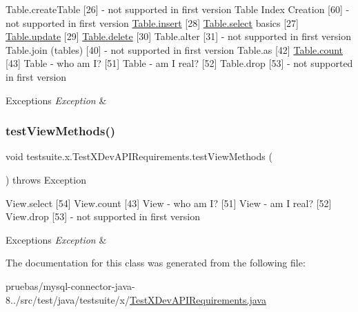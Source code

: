 Table.\+create\+Table \mbox{[}26\mbox{]} -\/ not supported in first version Table Index Creation \mbox{[}60\mbox{]} -\/ not supported in first version \mbox{\hyperlink{interfacecom_1_1mysql_1_1cj_1_1xdevapi_1_1_table_ae9faedd85539146509fa68982fc346f9}{Table.\+insert}} \mbox{[}28\mbox{]} \mbox{\hyperlink{interfacecom_1_1mysql_1_1cj_1_1xdevapi_1_1_table_a36559f114d9638a63d8743f1f1630017}{Table.\+select}} basics \mbox{[}27\mbox{]} \mbox{\hyperlink{interfacecom_1_1mysql_1_1cj_1_1xdevapi_1_1_table_a941215cefeb7236388db7d0390621a17}{Table.\+update}} \mbox{[}29\mbox{]} \mbox{\hyperlink{interfacecom_1_1mysql_1_1cj_1_1xdevapi_1_1_table_a52be4284a88e0a4f243580be570018e2}{Table.\+delete}} \mbox{[}30\mbox{]} Table.\+alter \mbox{[}31\mbox{]} -\/ not supported in first version Table.\+join (tables) \mbox{[}40\mbox{]} -\/ not supported in first version Table.\+as \mbox{[}42\mbox{]} \mbox{\hyperlink{interfacecom_1_1mysql_1_1cj_1_1xdevapi_1_1_table_a4f0524bd76d54d6b053187ea09ab2956}{Table.\+count}} \mbox{[}43\mbox{]} Table -\/ who am I? \mbox{[}51\mbox{]} Table -\/ am I real? \mbox{[}52\mbox{]} Table.\+drop \mbox{[}53\mbox{]} -\/ not supported in first version


\begin{DoxyExceptions}{Exceptions}
{\em Exception} & \\
\hline
\end{DoxyExceptions}
\mbox{\label{classtestsuite_1_1x_1_1_test_x_dev_a_p_i_requirements_abe35866f814afea6ea1f17133b93d9de}} 
\subsubsection{\texorpdfstring{test\+View\+Methods()}{testViewMethods()}}
{\footnotesize\ttfamily void testsuite.\+x.\+Test\+X\+Dev\+A\+P\+I\+Requirements.\+test\+View\+Methods (\begin{DoxyParamCaption}{ }\end{DoxyParamCaption}) throws Exception}

View.\+select \mbox{[}54\mbox{]} View.\+count \mbox{[}43\mbox{]} View -\/ who am I? \mbox{[}51\mbox{]} View -\/ am I real? \mbox{[}52\mbox{]} View.\+drop \mbox{[}53\mbox{]} -\/ not supported in first version


\begin{DoxyExceptions}{Exceptions}
{\em Exception} & \\
\hline
\end{DoxyExceptions}


The documentation for this class was generated from the following file\+:\begin{DoxyCompactItemize}
\item 
pruebas/mysql-\/connector-\/java-\/8../src/test/java/testsuite/x/\mbox{\hyperlink{_test_x_dev_a_p_i_requirements_8java}{Test\+X\+Dev\+A\+P\+I\+Requirements.\+java}}\end{DoxyCompactItemize}
